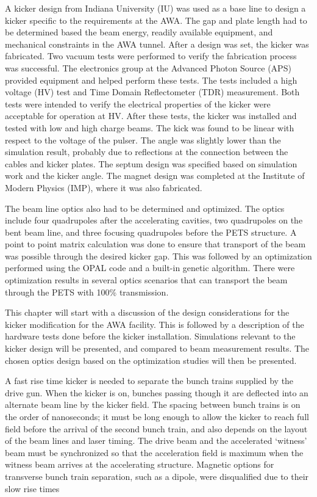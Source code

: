 A kicker design from Indiana University (IU) was used as a base line to design a kicker specific to the
requirements at the AWA. The gap and plate length had to be determined based the beam energy, 
readily available equipment, and mechanical constraints in the AWA tunnel. 
After a design was set, the kicker was fabricated.
Two vacuum tests were performed to verify the fabrication process was successful.
The electronics group at the Advanced Photon Source (APS) provided equipment and helped perform these tests.
The tests included a high voltage (HV) test and Time Domain Reflectometer (TDR) measurement.
Both tests were intended to verify the electrical properties of the kicker were acceptable for operation at HV.
After these tests, the kicker was installed and tested with low and high charge beams. 
The kick was found to be linear with respect to the voltage of the pulser.  
The angle was slightly lower than the simulation result, probably due to reflections at the
connection between the cables and kicker plates. 
The septum design was specified based on simulation work and the kicker angle.
The magnet design was completed at the Institute of Modern Physics (IMP), 
where it was also fabricated. 

The beam line optics also had to be determined and optimized.
The optics include four quadrupoles after the accelerating cavities, 
two quadrupoles on the bent beam line, and three focusing quadrupoles
before the PETS structure.
A point to point matrix calculation was done to ensure that transport of the
beam was possible through the desired kicker gap.  This was followed by an optimization 
performed using the OPAL code and a built-in genetic algorithm. 
There were optimization results in several optics scenarios that can transport 
the beam through the PETS with 100\% transmission.  

This chapter will start with a discussion of the design considerations for the kicker modification for the AWA facility.  
This is followed by a description of the hardware tests done before the kicker installation.  
Simulations relevant to the kicker design will be presented, and compared to beam measurement results.  
The chosen optics design based on the optimization studies will then be presented.


 \label{theory}

A fast rise time kicker is needed to separate the 
bunch trains supplied by the drive gun.  When the kicker is on, 
bunches passing though it are deflected into an alternate beam line by the kicker field.
The spacing between bunch trains is on the order of nanoseconds; 
it must be long enough to allow the kicker to reach full field before the arrival of the second bunch train, 
and also depends on the layout of the beam lines and laser timing.  
The drive beam and the accelerated `witness' beam must be synchronized so that the 
acceleration field is maximum when the witness beam arrives at the accelerating structure.
Magnetic options for transverse bunch train separation, 
such as a dipole, were disqualified due to their slow rise times 

